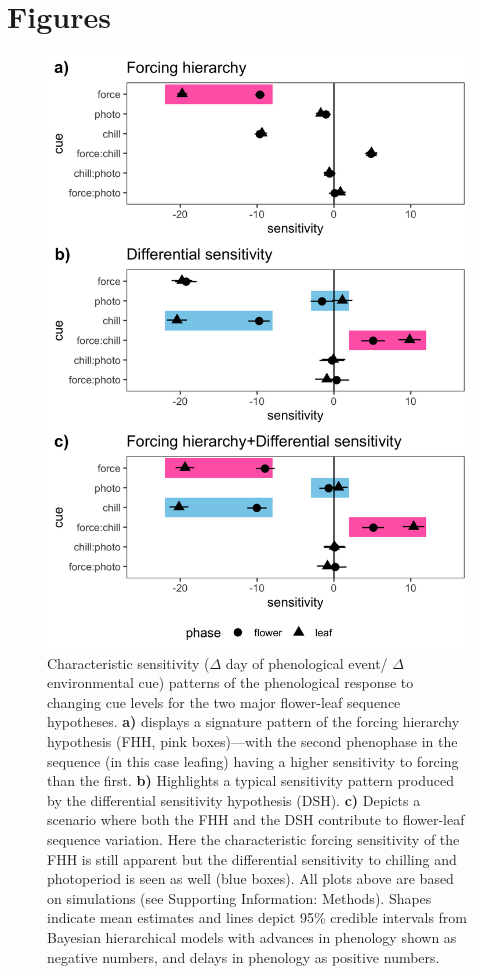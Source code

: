 \documentclass[12pt]{article}\usepackage[]{graphicx}\usepackage[]{color}
\begin{document}
\section*{Figures}
\begin{figure}[h!]
    \centering
         \includegraphics[width=.7\textwidth]{..//Plots/Flobuds_manuscript_figs/simulations.png}
    \caption{Characteristic sensitivity ($\Delta$ day of phenological event/ $\Delta$ environmental cue) patterns of the phenological response to changing cue levels for the two major flower-leaf sequence hypotheses.  \textbf{a)} displays a signature pattern of the forcing hierarchy hypothesis (FHH, pink boxes)---with the second phenophase in the sequence (in this case leafing) having a higher sensitivity to forcing than the first.  \textbf{b)} Highlights a typical sensitivity pattern produced by the differential sensitivity hypothesis (DSH). \textbf{c)} Depicts a scenario where both the FHH and the DSH contribute to flower-leaf sequence variation. Here the characteristic forcing sensitivity of the FHH is still apparent but the differential sensitivity to chilling and photoperiod is seen as well (blue boxes). All plots above are based on simulations (see Supporting Information: Methods). Shapes indicate mean estimates and lines depict 95\% credible intervals from Bayesian hierarchical models with advances in phenology shown as negative numbers, and delays in phenology as positive numbers. } 
    \label{fig:simulations}
\end{figure}
\clearall %
\end{document}
